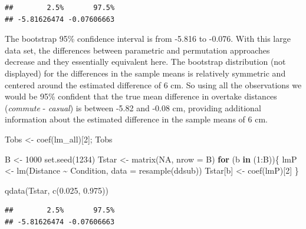 \documentclass[
]{book}
\newenvironment{Shaded}{\begin{snugshade}}{\end{snugshade}}
\newcommand{\AttributeTok}[1]{\textcolor[rgb]{0.77,0.63,0.00}{#1}}
\newcommand{\ConstantTok}[1]{\textcolor[rgb]{0.00,0.00,0.00}{#1}}
\newcommand{\ControlFlowTok}[1]{\textcolor[rgb]{0.13,0.29,0.53}{\textbf{#1}}}
\newcommand{\DecValTok}[1]{\textcolor[rgb]{0.00,0.00,0.81}{#1}}
\newcommand{\FloatTok}[1]{\textcolor[rgb]{0.00,0.00,0.81}{#1}}
\newcommand{\FunctionTok}[1]{\textcolor[rgb]{0.00,0.00,0.00}{#1}}
\newcommand{\NormalTok}[1]{#1}
\newcommand{\OtherTok}[1]{\textcolor[rgb]{0.56,0.35,0.01}{#1}}
\newcommand{\SpecialCharTok}[1]{\textcolor[rgb]{0.00,0.00,0.00}{#1}}
\begin{document}
\begin{verbatim}
##        2.5%       97.5% 
## -5.81626474 -0.07606663
\end{verbatim}

The bootstrap 95\% confidence interval is from -5.816 to -0.076. With this large data set, the differences between parametric and permutation approaches decrease and they essentially equivalent here. The bootstrap distribution (not displayed) for the differences in the sample means is relatively symmetric and centered around the estimated difference of 6 cm. So using all the observations we would be 95\% confident that the true mean difference in overtake distances (\emph{commute} - \emph{casual}) is between -5.82 and -0.08 cm, providing additional information about the estimated difference in the sample means of 6 cm.

\begin{Shaded}
\begin{Highlighting}[]
\NormalTok{Tobs }\OtherTok{\textless{}{-}} \FunctionTok{coef}\NormalTok{(lm\_all)[}\DecValTok{2}\NormalTok{]; Tobs}

\NormalTok{B }\OtherTok{\textless{}{-}} \DecValTok{1000}
\FunctionTok{set.seed}\NormalTok{(}\DecValTok{1234}\NormalTok{)}
\NormalTok{Tstar }\OtherTok{\textless{}{-}} \FunctionTok{matrix}\NormalTok{(}\ConstantTok{NA}\NormalTok{, }\AttributeTok{nrow =}\NormalTok{ B)}
\ControlFlowTok{for}\NormalTok{ (b }\ControlFlowTok{in}\NormalTok{ (}\DecValTok{1}\SpecialCharTok{:}\NormalTok{B))\{}
\NormalTok{  lmP }\OtherTok{\textless{}{-}} \FunctionTok{lm}\NormalTok{(Distance }\SpecialCharTok{\textasciitilde{}}\NormalTok{ Condition, }\AttributeTok{data =} \FunctionTok{resample}\NormalTok{(ddsub))}
\NormalTok{  Tstar[b] }\OtherTok{\textless{}{-}} \FunctionTok{coef}\NormalTok{(lmP)[}\DecValTok{2}\NormalTok{]}
\NormalTok{\}}
\end{Highlighting}
\end{Shaded}

\begin{Shaded}
\begin{Highlighting}[]
\FunctionTok{qdata}\NormalTok{(Tstar, }\FunctionTok{c}\NormalTok{(}\FloatTok{0.025}\NormalTok{, }\FloatTok{0.975}\NormalTok{))}
\end{Highlighting}
\end{Shaded}

\begin{verbatim}
##        2.5%       97.5% 
## -5.81626474 -0.07606663
\end{verbatim}
\end{document}
